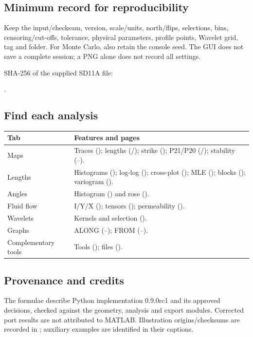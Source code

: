\subsection{Minimum record for reproducibility}
Keep the input/checksum, version, scale/units, north/flips, selections, bins, censoring/cut-offs, tolerance, physical parameters, profile points, Wavelet grid, tag and folder. For Monte Carlo, also retain the console seed. The GUI does not save a complete session; a PNG alone does not record all settings.

SHA-256 of the supplied SD11A file:\par
{}.

\subsection{Find each analysis}
\begin{longtable}{@{}p{.23\linewidth}p{.69\linewidth}@{}}
\toprule Tab & Features and pages\\\midrule\endhead
Maps & Traces (\pageref{feat:MAP-01}); lengths (\pageref{feat:MAP-04}/\pageref{feat:MAP-05}); strike (\pageref{feat:MAP-06}); P21/P20 (\pageref{feat:MAP-07}/\pageref{feat:MAP-08}); stability (\pageref{feat:MAP-11}--\pageref{feat:MAP-14}).\\
Lengths & Histograms (\pageref{feat:LEN-02}); log-log (\pageref{feat:LEN-03}); cross-plot (\pageref{feat:LEN-06}); MLE (\pageref{feat:LEN-07}); blocks (\pageref{feat:LEN-13}); variogram (\pageref{feat:LEN-15}).\\
Angles & Histogram (\pageref{feat:ANG-01}) and rose (\pageref{feat:ANG-02}).\\
Fluid flow & I/Y/X (\pageref{feat:FLO-01}); tensors (\pageref{feat:FLO-08}); permeability (\pageref{feat:FLO-09}).\\
Wavelets & Kernels and selection (\pageref{feat:WAV-01}).\\
Graphs & ALONG (\pageref{feat:GRA-03}--\pageref{feat:GRA-07}); FROM (\pageref{feat:GRA-10}--\pageref{feat:GRA-12}).\\
Complementary tools & Tools (\pageref{sec:aux}); files (\pageref{sec:exports}).\\\bottomrule
\end{longtable}

\subsection{Provenance and credits}
The formulae describe Python implementation 0.9.0rc1 and its approved decisions, checked against the geometry, analysis and export modules. Corrected port results are not attributed to MATLAB. Illustration origins/checksums are recorded in ; auxiliary examples are identified in their captions.

